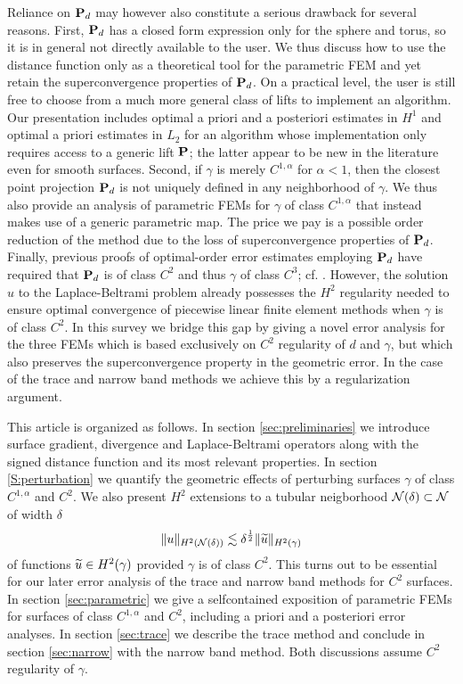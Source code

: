 Reliance on ${\bf P}_{d}$ may however also constitute a serious drawback for several reasons. First, ${\bf P}_d$ has a closed form expression only for the sphere and torus, so it is in general not directly available to the user.  We thus discuss how to use the distance function only as a theoretical tool for the parametric FEM and yet retain the superconvergence properties of ${\bf P}_{d}$.  On a practical level, the user is still free to choose from a much more general class of lifts to implement an algorithm.  Our presentation includes optimal a priori and a posteriori estimates in $H^1$ and optimal a priori estimates in $L_2$ for an algorithm whose implementation only requires access to a generic lift ${\bf P}$; the latter appear to be new in the literature even for smooth surfaces.
Second, if $\gamma$ is merely $C^{1,\alpha}$ for $\alpha<1$, then the closest point projection ${\bf P}_d$ is not uniquely defined in any neighborhood of $\gamma$.  We thus also provide an analysis of parametric FEMs for $\gamma$ of class $C^{1, \alpha}$ that instead makes use of a generic parametric map.  The price we pay is a possible order reduction of the method due to the loss of superconvergence properties of ${\bf P}_{d}$.  %
Finally, previous proofs of optimal-order error estimates employing ${\bf P}_{d}$ have required that ${\bf P}_{d}$ is of class $C^2$ and thus $\gamma$ of class $C^3$; cf. \cite{Dz88}.  However, the solution $u$ to the Laplace-Beltrami problem already possesses the $H^2$ regularity needed to ensure optimal convergence of piecewise linear finite element methods when $\gamma$ is of class $C^2$.  In this survey we bridge this gap by giving a novel error analysis for the three FEMs which is based exclusively on $C^2$ regularity of $d$ and $\gamma$, but which also preserves the superconvergence property in the geometric error.   In the case of the trace and narrow band methods we achieve this by a regularization argument.


This article is organized as follows. In section \ref{sec:preliminaries} we
introduce surface gradient, divergence and
Laplace-Beltrami operators along with the signed distance function and its most
relevant properties. In section \ref{S:perturbation} we quantify the geometric effects
of perturbing surfaces $\gamma$ of class $C^{1,\alpha}$ and $C^2$. We also present
$H^2$ extensions to a tubular neigborhood
${\mathcal{N}(\delta)}\subset\mathcal{N}$ of width $\delta$
%
\begin{equation*}
\|u\|_{H^2({\mathcal{N}(\delta)})} \lesssim \delta^{\frac12} \|\widetilde{u}\|_{H^2(\gamma)}
\end{equation*}
%
of functions $\widetilde{u}\in H^2(\gamma)$ provided $\gamma$ is of class $C^2$.
This turns out to be essential for our later
error analysis of the trace and narrow band methods for $C^2$ surfaces.
In section \ref{sec:parametric} we give a
selfcontained exposition of parametric FEMs for surfaces of class $C^{1,\alpha}$ and
$C^2$, including a priori and a posteriori error analyses. In section \ref{sec:trace}
we describe the trace method and conclude in section \ref{sec:narrow} with the
narrow band method. Both discussions assume $C^2$ regularity of $\gamma$.
